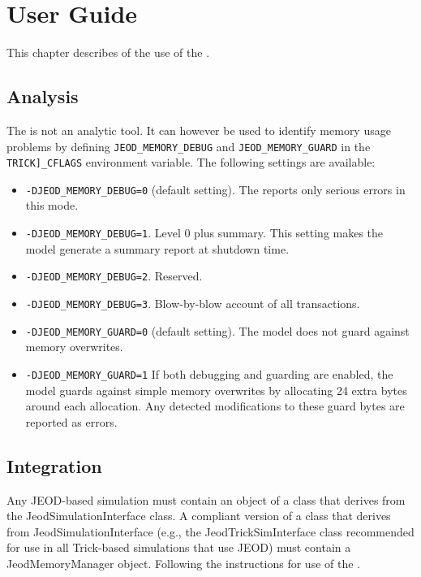 %
% 

\chapter{User Guide}
\label{ch:overview:user}

This chapter describes of the use of the \ModelDesc.

\section{Analysis}
The \ModelDesc is not an analytic tool. It can however be used to identify
memory usage problems by defining {\tt JEOD\_MEMORY\_DEBUG} and
{\tt JEOD\_MEMORY\_GUARD} in the {\tt TRICK]\_CFLAGS} environment variable.
The following settings are available:
\begin{itemize}
\item {\tt -DJEOD\_MEMORY\_DEBUG=0} (default setting).
  The \ModelDesc reports only serious errors in this mode.
\item {\tt -DJEOD\_MEMORY\_DEBUG=1}. Level 0 plus summary.
  This setting makes the model generate a summary report at shutdown time.
\item {\tt -DJEOD\_MEMORY\_DEBUG=2}. Reserved.
\item {\tt -DJEOD\_MEMORY\_DEBUG=3}. Blow-by-blow account of all transactions.
\item {\tt -DJEOD\_MEMORY\_GUARD=0} (default setting).
  The model does not guard against memory overwrites.
\item {\tt -DJEOD\_MEMORY\_GUARD=1}
  If both debugging and guarding are enabled, the model guards against simple
  memory overwrites by allocating 24 extra bytes around each allocation.
  Any detected modifications to these guard bytes are reported as errors.
\end{itemize}

\section{Integration}
Any JEOD-based simulation must contain an object of a class that derives from
the JeodSimulationInterface class. A compliant version of a class that derives
from JeodSimulationInterface (e.g., the JeodTrickSimInterface class recommended
for use in all Trick-based simulations that use JEOD)
must contain a JeodMemoryManager object.
Following the instructions for use of the .

